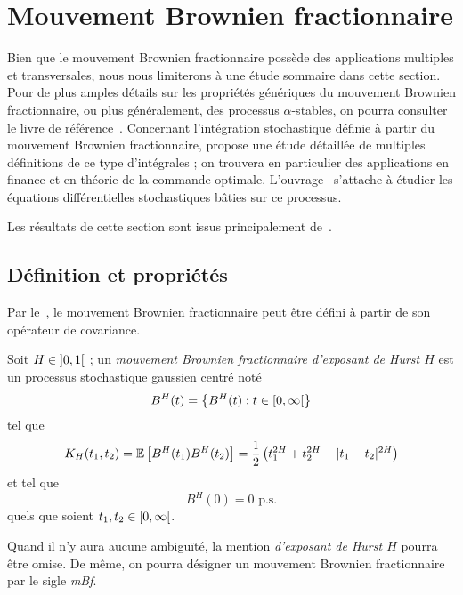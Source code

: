 \section{Mouvement Brownien fractionnaire}
\label{sec:fBm-1d}

Bien que le mouvement Brownien fractionnaire possède des applications
multiples et transversales, nous nous limiterons à une étude sommaire
dans cette section. Pour de plus amples détails sur les propriétés
génériques du mouvement Brownien fractionnaire, ou plus généralement,
des processus $\alpha$-stables, on pourra consulter le livre de
référence~\cite{samorodnitsky1994}. Concernant l'intégration
stochastique définie à partir du mouvement Brownien fractionnaire,
\cite{biagini2008} propose une étude détaillée de multiples
définitions de ce type d'intégrales ; on trouvera en particulier des
applications en finance et en théorie de la commande
optimale. L'ouvrage~\cite{mishura2008} s'attache à étudier les
équations différentielles stochastiques bâties sur ce processus.

Les résultats de cette section sont issus principalement
de~\cite{biagini2008,nourdin2012}.

\subsection{Définition et propriétés}
\label{subsec:fBm-def}

Par le~, le mouvement Brownien
fractionnaire peut être défini à partir de son opérateur de
covariance.

\begin{definition}
  \label{def:fBm}
  Soit $H\in\left]0,1\right[$ ; un \emph{mouvement Brownien fractionnaire
    d'exposant de Hurst $H$} est un processus stochastique gaussien
  centré noté
  \[ B^H(t) = \left\{B^H(t) : t \in \left[0,\infty\right[\right\} \] tel
  que
  \begin{align}
    \label{eqn:fBm-cov}
    K_H(t_1,t_2) = \mathbb{E}\left[B^H(t_1)B^H(t_2)\right] = \frac{1}{2}\left(t_1^{2H}+t_2^{2H}-|t_1-t_2|^{2H}\right)
  \end{align}
  et tel que \[ B^H(0) = 0 \text{ p.s.} \] quels que soient
  $t_1,t_2\in\left[0,\infty\right[$.
\end{definition}

\begin{notation}
  Quand il n'y aura aucune ambiguïté, la mention \emph{\og d'exposant
    de Hurst $H$\fg{}} pourra être omise. De même, on pourra désigner
  un mouvement Brownien fractionnaire par le sigle \emph{\og
    mBf\fg{}}.
\end{notation}


